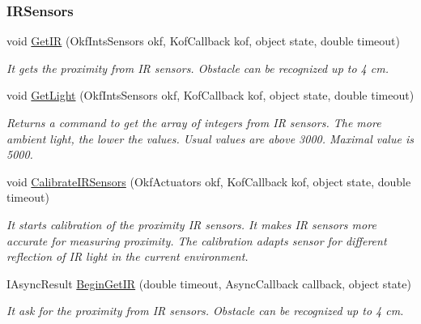 \subsubsection*{IRSensors} %
\label{ssub:IRSensors}
  \begin{DoxyCompactItemize}

  \item  void \hyperlink{class_elib_1_1_epuck_a18153b3e43432af66a9baa973b77c5bd}{GetIR} (OkfIntsSensors okf, KofCallback kof, object state, double timeout)
  \begin{DoxyCompactList}\small\item\em It gets the proximity from IR sensors. Obstacle can be recognized up to 4 cm. \item\end{DoxyCompactList}

  \item   void \hyperlink{class_elib_1_1_epuck_a99130d9756d311379572f65411539888}{GetLight} (OkfIntsSensors okf, KofCallback kof, object state, double timeout)
  \begin{DoxyCompactList}\small\item\em Returns a command to get the array of integers from IR sensors. The more ambient light, the lower the values. Usual values are above 3000. Maximal value is 5000. \item\end{DoxyCompactList}

  \item void \hyperlink{class_elib_1_1_epuck_aa15c26b061ee31dfb343f546d89bd864}{CalibrateIRSensors} (OkfActuators okf, KofCallback kof, object state, double timeout)
  \begin{DoxyCompactList}\small\item\em It starts calibration of the proximity IR sensors. It makes IR sensors more accurate for measuring proximity. The calibration adapts sensor for different reflection of IR light in the current environment. \item\end{DoxyCompactList}

  \item   IAsyncResult \hyperlink{class_elib_1_1_epuck_a66741b5d59b9bb5a26596b050741dee8}{BeginGetIR} (double timeout, AsyncCallback callback, object state)
  \begin{DoxyCompactList}\small\item\em It ask for the proximity from IR sensors. Obstacle can be recognized up to 4 cm. \item\end{DoxyCompactList}


\end{DoxyCompactItemize}
